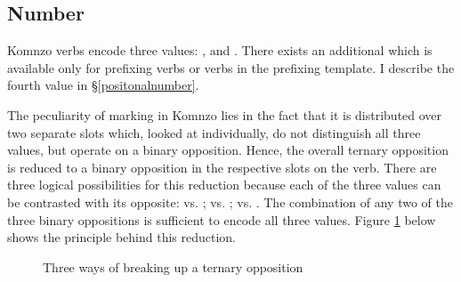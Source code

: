 \subsection{Number} \label{numbersubsec}

Komnzo verbs encode three  values: ,  and . There exists an additional  which is available only for prefixing verbs or verbs in the prefixing template. I describe the fourth  value in \S{}\ref{positonalnumber}.%

The peculiarity of  marking in Komnzo lies in the fact that it is distributed over two separate slots which, looked at individually, do not distinguish all three values, but operate on a binary opposition. Hence, the overall ternary  opposition is reduced to a binary opposition in the respective slots on the verb. There are three logical possibilities for this reduction because each of the three  values can be contrasted with its opposite:  vs. ;  vs. ;  vs. . The combination of any two of the three binary oppositions is sufficient to encode all three  values. Figure \ref{ternbinary} below shows the principle behind this reduction.

\begin{figure}

\caption{Three ways of breaking up a ternary opposition}\label{ternbinary}
\end{figure}%

